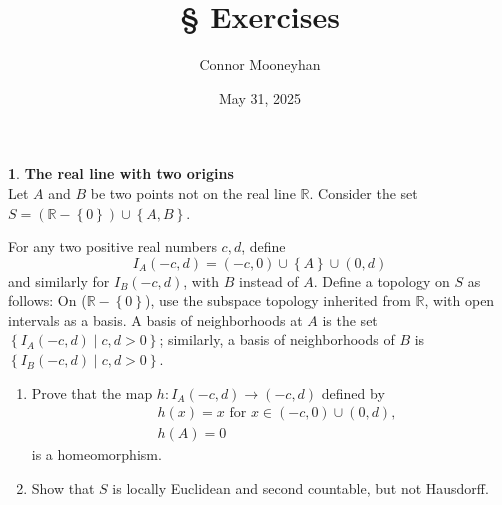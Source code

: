 \documentclass[12pt]{article}
\title{\S\arabic{section} Exercises}
\author{Connor Mooneyhan}
\date{May 31, 2025}
\theoremstyle{definition}
\newtheorem{ex}{}[section]
\begin{document}
\maketitle

\begin{ex}
	\textbf{The real line with two origins} \\
	Let $A$ and $B$ be two points not on the real line $\mathbb{R}$.
	Consider the set $S = (\mathbb{R} - \left\lbrace 0 \right\rbrace) \cup \left\lbrace A, B \right\rbrace$.
	\begin{center}
	\end{center}
	For any two positive real numbers $c, d$, define \begin{equation*}
		I_A(-c, d) = (-c, 0) \cup \left\lbrace A \right\rbrace \cup (0, d)
	\end{equation*}
	and similarly for $I_B(-c, d)$, with $B$ instead of $A$.
	Define a topology on $S$ as follows: On ($\mathbb{R} - \left\lbrace 0 \right\rbrace$), use the subspace topology inherited from $\mathbb{R}$, with open intervals as a basis.
	A basis of neighborhoods at $A$ is the set $\left\lbrace I_A(-c, d) \mid c, d > 0 \right\rbrace$; similarly, a basis of neighborhoods of $B$ is $\left\lbrace I_B(-c, d) \mid c,d > 0 \right\rbrace$.
	\begin{enumerate}[label=(\alph*)]
		\item Prove that the map $h: I_A(-c, d) \to (-c, d)$ defined by \begin{align*}
			       & h(x) = x \text{ for } x \in (-c, 0) \cup (0, d), \\
			       & h(A) = 0
		      \end{align*}
		      is a homeomorphism.
		\item Show that $S$ is locally Euclidean and second countable, but not Hausdorff.
	\end{enumerate}
\end{ex}
\end{document}
